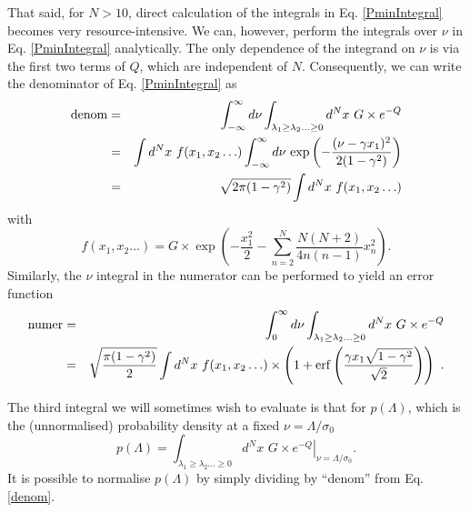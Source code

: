 \documentclass[12pt]{article}
\begin{document}
That said, for $N>10$, direct calculation of the integrals in Eq. \ref{PminIntegral} becomes very resource-intensive. We can, however, perform the integrals over $\nu$ in Eq. \ref{PminIntegral} analytically. The only dependence of the integrand on $\nu$ is via the first two terms of $Q$, which are independent of $N$. Consequently, we can write the denominator of Eq. \ref{PminIntegral} as 
%
\begin{eqnarray}\label{denom}
\nonumber {\rm denom} &=&
\int^\infty_{-\infty} d\nu \int_{\lambda_1 \geq \lambda_2 \ldots \geq 0} d^Nx \,\,G \times e^{-Q} \\ 
\nonumber &=&  \int d^Nx\,\, f(x_1,x_2 \ldots )  \int^\infty_{-\infty} d\nu \,\exp\left(-\frac{(\nu- \gamma x_1)^2}{2(1-\gamma^2)}\right)\\
&=& \sqrt{2\pi (1-\gamma^2)}  \int d^N x \,\, f(x_1,x_2 \ldots )
\end{eqnarray}
%
with
%
\begin{equation*} f(x_1,x_2 \ldots ) =  G\times \exp\left(-\frac{x_1^2}{2}-\sum_{n=2}^N\frac{N(N+2)}{4n(n-1)}x_n^2 \right).
\end{equation*}
% 
Similarly, the $\nu$ integral in the numerator can be performed to yield an error function
%
\begin{eqnarray}\label{numer}
\nonumber {\rm numer} &=&
\int^\infty_{0} d\nu \int_{\lambda_1 \geq \lambda_2 \ldots \geq 0}d^N x\,\, G \times e^{-Q} \\ 
&=& \sqrt{\frac{\pi (1-\gamma^2)}{2}}  \int d^N x \,\, f(x_1,x_2 \ldots )\times \left(1+{\rm erf}\left(\frac{\gamma x_1 \sqrt{1-\gamma^2}}{\sqrt{2}}\right) \right)\,\, .
\end{eqnarray}

The third integral we will sometimes wish to evaluate is that for $p(\Lambda)$, which is the (unnormalised) probability density at a fixed $\nu=\Lambda/\sigma_0$
%
\begin{equation}\label{plam}
p(\Lambda) = \int_{\lambda_1 \geq \lambda_2 \ldots \geq 0}d^N x\,\, G\times \left.e^{-Q}\right|_{\nu=\Lambda/\sigma_0}.
\end{equation}
%
It is possible to normalise $p(\Lambda)$ by simply dividing by ``denom'' from Eq. \eqref{denom}.
\end{document}
